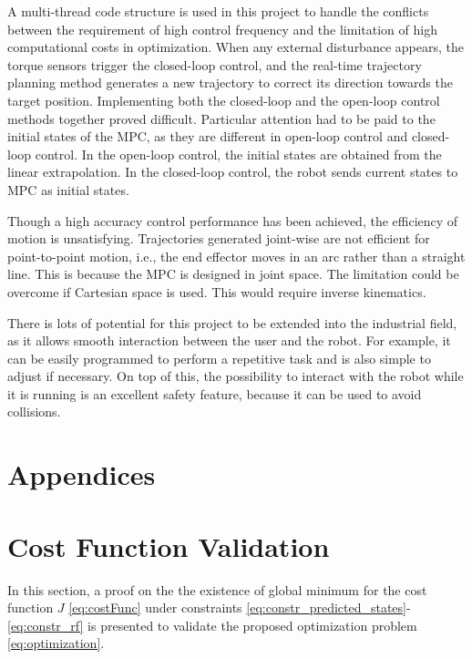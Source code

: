 \documentclass[final]{LTHtwocol} %
\begin{document}
A multi-thread code structure is used in this project to handle the conflicts between the requirement of high control frequency and the limitation of high computational costs in optimization. When any external disturbance appears, the torque sensors trigger the closed-loop control, and the real-time trajectory planning method generates a new trajectory to correct its direction towards the target position. Implementing both the closed-loop and the open-loop control methods together proved difficult. Particular attention had to be paid to the initial states of the MPC, as they are different in open-loop control and closed-loop control. In the open-loop control, the initial states are obtained from the linear extrapolation. In the closed-loop control, the robot sends current states to MPC as initial states.

Though a high accuracy control performance has been achieved, the efficiency of motion is unsatisfying. Trajectories generated joint-wise are not efficient for point-to-point motion, i.e., the end effector moves in an arc rather than a straight line. This is because the MPC is designed in joint space. The limitation could be overcome if Cartesian space is used. This would require inverse kinematics.

There is lots of potential for this project to be extended into the industrial field, as it allows smooth interaction between the user and the robot. For example, it can be easily programmed to perform a repetitive task and is also simple to adjust if necessary. On top of this, the possibility to interact with the robot while it is running is an excellent safety feature, because it can be used to avoid collisions.

\printbibliography
\newpage
\section*{Appendices}
\appendix

\section{Cost Function Validation} \label{apx:proof}
In this section, a proof on the the existence of global minimum for the cost function $J$ \eqref{eq:costFunc} under constraints \eqref{eq:constr_predicted_states}- \eqref{eq:constr_rf} is presented to validate the proposed optimization problem \eqref{eq:optimization}.
\end{document}
